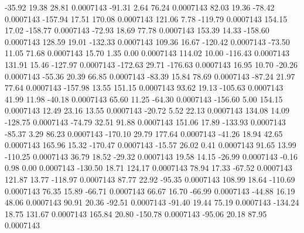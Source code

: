       -35.92       19.38       28.81     0.0007143
      -91.31        2.64       76.24     0.0007143
       82.03       19.36      -78.42     0.0007143
     -157.94       17.51      170.08     0.0007143
      121.06        7.78     -119.79     0.0007143
      154.15       17.02     -158.77     0.0007143
      -72.93       18.69       77.78     0.0007143
      153.39       14.33     -158.60     0.0007143
      128.59       19.01     -132.33     0.0007143
      109.36       16.67     -120.42     0.0007143
      -73.50       11.05       71.68     0.0007143
       15.70        1.35        0.00     0.0007143
      114.02       10.00     -116.43     0.0007143
      131.91       15.46     -127.97     0.0007143
     -172.63       29.71     -176.63     0.0007143
       16.95       10.70      -20.26     0.0007143
      -55.36       20.39       66.85     0.0007143
      -83.39       15.84       78.69     0.0007143
      -87.24       21.97       77.64     0.0007143
     -157.98       13.55      151.15     0.0007143
       93.62       19.13     -105.63     0.0007143
       41.99       11.98      -40.18     0.0007143
       65.60       11.25      -64.30     0.0007143
     -156.60        5.00      154.15     0.0007143
       12.49       23.16       13.55     0.0007143
      -20.72        5.52       22.13     0.0007143
      134.08       14.09     -128.75     0.0007143
      -74.79       32.51       91.88     0.0007143
      151.06       17.89     -133.93     0.0007143
      -85.37        3.29       86.23     0.0007143
     -170.10       29.79      177.64     0.0007143
      -41.26       18.94       42.65     0.0007143
      165.96       15.32     -170.47     0.0007143
      -15.57       26.02        0.41     0.0007143
       91.65       13.99     -110.25     0.0007143
       36.79       18.52      -29.32     0.0007143
       19.58       14.15      -26.99     0.0007143
       -0.16        0.98        0.00     0.0007143
     -130.50       18.71      124.17     0.0007143
       78.94       17.33      -67.52     0.0007143
      121.87       13.77     -118.97     0.0007143
       87.77       22.92      -95.35     0.0007143
      108.99       18.64     -110.69     0.0007143
       76.35       15.89      -66.71     0.0007143
       66.67       16.70      -66.99     0.0007143
      -44.88       16.19       48.06     0.0007143
       90.91       20.36      -92.51     0.0007143
      -91.40       19.44       75.19     0.0007143
     -134.24       18.75      131.67     0.0007143
      165.84       20.80     -150.78     0.0007143
      -95.06       20.18       87.95     0.0007143
